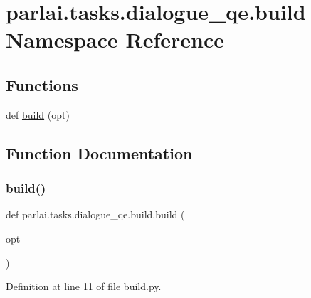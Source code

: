 \hypertarget{namespaceparlai_1_1tasks_1_1dialogue__qe_1_1build}{}\section{parlai.\+tasks.\+dialogue\+\_\+qe.\+build Namespace Reference}
\label{namespaceparlai_1_1tasks_1_1dialogue__qe_1_1build}
\subsection*{Functions}
\begin{DoxyCompactItemize}
\item 
def \hyperlink{namespaceparlai_1_1tasks_1_1dialogue__qe_1_1build_ab572df1748a38a9aa82871577c0cd8e6}{build} (opt)
\end{DoxyCompactItemize}


\subsection{Function Documentation}
\mbox{\label{namespaceparlai_1_1tasks_1_1dialogue__qe_1_1build_ab572df1748a38a9aa82871577c0cd8e6}} 
\subsubsection{\texorpdfstring{build()}{build()}}
{\footnotesize\ttfamily def parlai.\+tasks.\+dialogue\+\_\+qe.\+build.\+build (\begin{DoxyParamCaption}\item[{}]{opt }\end{DoxyParamCaption})}



Definition at line 11 of file build.\+py.

